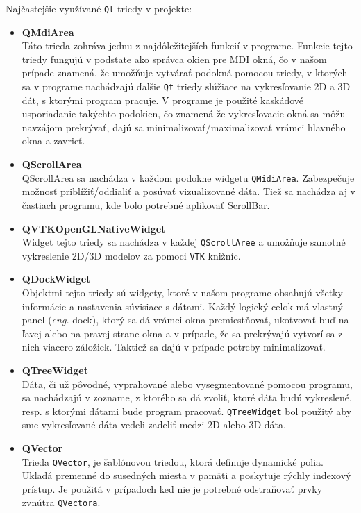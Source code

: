 \documentclass[a4paper,11pt,oneside]{article}%
\begin{document}
Najčastejšie využívané \texttt{Qt} triedy v projekte:
\begin{itemize}
\item \textbf{QMdiArea}\\ 
Táto trieda zohráva jednu z najdôležitejších funkcií v programe. Funkcie tejto triedy fungujú v podstate ako správca okien pre MDI okná, čo v našom prípade znamená, že umožňuje vytvárať podokná pomocou triedy, v ktorých sa v programe nachádzajú ďalšie \texttt{Qt} triedy slúžiace na vykresľovanie 2D a 3D dát, s ktorými program pracuje. V programe je použité kaskádové usporiadanie takýchto podokien, čo znamená že vykresľovacie okná sa môžu navzájom prekrývať, dajú sa minimalizovať/maximalizovať vrámci hlavného okna a zavrieť.

\item \textbf{QScrollArea} \\
QScrollArea sa nachádza v každom podokne widgetu \texttt{QMidiArea}. Zabezpečuje možnosť priblížiť/oddialiť a posúvať vizualizované dáta. Tiež sa nachádza aj v častiach programu, kde bolo potrebné aplikovať ScrollBar.

\item \textbf{QVTKOpenGLNativeWidget} \\
Widget tejto triedy sa nachádza v každej \texttt{QScrollAree} a umožňuje samotné vykreslenie 2D/3D modelov za pomoci \texttt{VTK} knižníc. 

\item \textbf{QDockWidget} \\
Objektmi tejto triedy sú widgety, ktoré v našom programe obsahujú všetky informácie a nastavenia súvisiace s dátami. Každý logický celok má vlastný panel (\textit{eng.} dock), ktorý sa dá vrámci okna premiestňovať, ukotvovať buď na ľavej alebo na pravej strane okna a v prípade, že sa prekrývajú vytvorí sa z nich viacero záložiek. Taktiež sa dajú v prípade potreby minimalizovať.

\item \textbf{QTreeWidget} \\ 
Dáta, či už pôvodné, vyprahované alebo vysegmentované pomocou programu, sa nachádzajú v zozname, z ktorého sa dá zvoliť, ktoré dáta budú vykreslené, resp. s ktorými dátami bude program pracovať. \texttt{QTreeWidget} bol použitý aby sme vykresľované dáta vedeli zadeliť medzi 2D alebo 3D dáta.

\item \textbf{QVector} \\
Trieda \texttt{QVector}, je šablónovou triedou, ktorá definuje dynamické polia. Ukladá premenné do susedných miesta v pamäti a poskytuje rýchly indexový prístup. Je použitá v prípadoch keď nie je potrebné odstraňovať prvky zvnútra \texttt{QVectora}.


\end{itemize}
\end{document}
